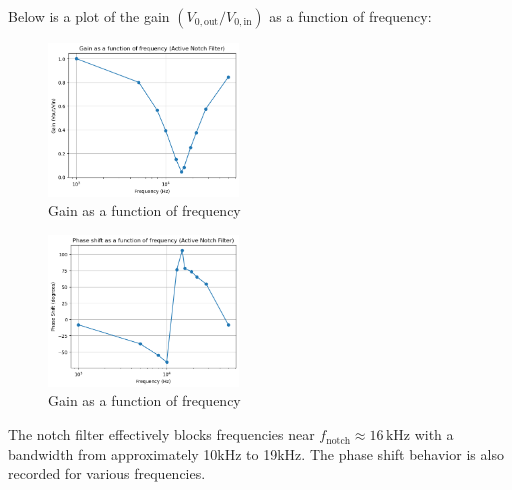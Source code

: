 \documentclass{article}
\begin{document}
Below is a plot of the gain \( (V_{0,\text{out}}/V_{0,\text{in}}) \) 
as a function of frequency:

\begin{figure}[H]
    \centering
    \includegraphics[width=0.45\textwidth]{img/Lab 9/1_4.png} %
    \caption{Gain as a function of frequency}
\end{figure}

\begin{figure}[H]
    \centering
    \includegraphics[width=0.45\textwidth]{img/Lab 9/1_5.png} %
    \caption{Gain as a function of frequency}
\end{figure}

The notch filter effectively blocks frequencies near 
\( f_{\text{notch}} \approx 16\,\text{kHz} \) with a bandwidth 
from approximately 10kHz to 19kHz. The phase shift behavior is 
also recorded for various frequencies.
\end{document}
